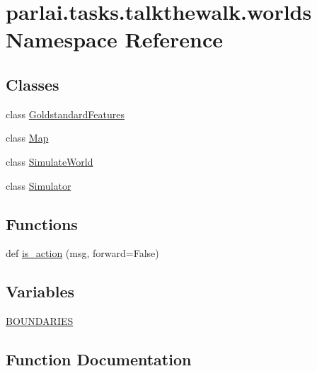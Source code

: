 \hypertarget{namespaceparlai_1_1tasks_1_1talkthewalk_1_1worlds}{}\section{parlai.\+tasks.\+talkthewalk.\+worlds Namespace Reference}
\label{namespaceparlai_1_1tasks_1_1talkthewalk_1_1worlds}
\subsection*{Classes}
\begin{DoxyCompactItemize}
\item 
class \hyperlink{classparlai_1_1tasks_1_1talkthewalk_1_1worlds_1_1GoldstandardFeatures}{Goldstandard\+Features}
\item 
class \hyperlink{classparlai_1_1tasks_1_1talkthewalk_1_1worlds_1_1Map}{Map}
\item 
class \hyperlink{classparlai_1_1tasks_1_1talkthewalk_1_1worlds_1_1SimulateWorld}{Simulate\+World}
\item 
class \hyperlink{classparlai_1_1tasks_1_1talkthewalk_1_1worlds_1_1Simulator}{Simulator}
\end{DoxyCompactItemize}
\subsection*{Functions}
\begin{DoxyCompactItemize}
\item 
def \hyperlink{namespaceparlai_1_1tasks_1_1talkthewalk_1_1worlds_aa28536df060005c301225d766f91cb13}{is\+\_\+action} (msg, forward=False)
\end{DoxyCompactItemize}
\subsection*{Variables}
\begin{DoxyCompactItemize}
\item 
\hyperlink{namespaceparlai_1_1tasks_1_1talkthewalk_1_1worlds_a8226866b052384337daa2a4b64460221}{B\+O\+U\+N\+D\+A\+R\+I\+ES}
\end{DoxyCompactItemize}


\subsection{Function Documentation}
\mbox{\label{namespaceparlai_1_1tasks_1_1talkthewalk_1_1worlds_aa28536df060005c301225d766f91cb13}} 

